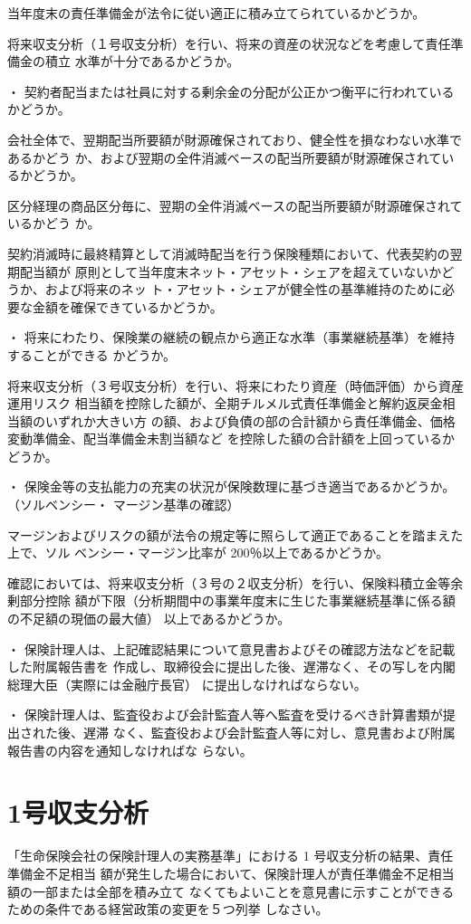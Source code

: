 \documentclass[report,gutter=10mm,fore-edge=10mm,uplatex,dvipdfmx]{jlreq}
\begin{document}
当年度末の責任準備金が法令に従い適正に積み立てられているかどうか。

将来収支分析（１号収支分析）を行い、将来の資産の状況などを考慮して責任準備金の積立
水準が十分であるかどうか。

・ 契約者配当または社員に対する剰余金の分配が公正かつ衡平に行われているかどうか。

会社全体で、翌期配当所要額が財源確保されており、健全性を損なわない水準であるかどう
か、および翌期の全件消滅ベースの配当所要額が財源確保されているかどうか。

区分経理の商品区分毎に、翌期の全件消滅ベースの配当所要額が財源確保されているかどう
か。

契約消滅時に最終精算として消滅時配当を行う保険種類において、代表契約の翌期配当額が
原則として当年度末ネット・アセット・シェアを超えていないかどうか、および将来のネッ
ト・アセット・シェアが健全性の基準維持のために必要な金額を確保できているかどうか。

・ 将来にわたり、保険業の継続の観点から適正な水準（事業継続基準）を維持することができる
かどうか。

将来収支分析（３号収支分析）を行い、将来にわたり資産（時価評価）から資産運用リスク
相当額を控除した額が、全期チルメル式責任準備金と解約返戻金相当額のいずれか大きい方
の額、および負債の部の合計額から責任準備金、価格変動準備金、配当準備金未割当額など
を控除した額の合計額を上回っているかどうか。

・ 保険金等の支払能力の充実の状況が保険数理に基づき適当であるかどうか。（ソルベンシー・
マージン基準の確認）

マージンおよびリスクの額が法令の規定等に照らして適正であることを踏まえた上で、ソル
ベンシー・マージン比率が 200％以上であるかどうか。

確認においては、将来収支分析（３号の２収支分析）を行い、保険料積立金等余剰部分控除
額が下限（分析期間中の事業年度末に生じた事業継続基準に係る額の不足額の現価の最大値）
以上であるかどうか。

・ 保険計理人は、上記確認結果について意見書およびその確認方法などを記載した附属報告書を
作成し、取締役会に提出した後、遅滞なく、その写しを内閣総理大臣（実際には金融庁長官）
に提出しなければならない。

・ 保険計理人は、監査役および会計監査人等へ監査を受けるべき計算書類が提出された後、遅滞
なく、監査役および会計監査人等に対し、意見書および附属報告書の内容を通知しなければな
らない。

\section{1号収支分析}
「生命保険会社の保険計理人の実務基準」における 1 号収支分析の結果、責任準備金不足相当
額が発生した場合において、保険計理人が責任準備金不足相当額の一部または全部を積み立て
なくてもよいことを意見書に示すことができるための条件である経営政策の変更を５つ列挙
しなさい。
\end{document}
